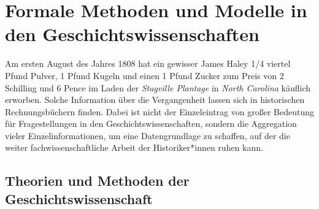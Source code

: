 \documentclass[12pt,a4paper]{article}
\begin{document}
\section{Formale Methoden und Modelle in den Geschichtswissenschaften}

Am ersten August des Jahres 1808 hat ein gewisser James Haley 1/4 viertel Pfund Pulver, 1 Pfund Kugeln und einen 1 Pfund Zucker zum Preis von 2 Schilling und 6 Pence im Laden der \textit{Stagville Plantage} in \textit{North Carolina} käuflich erworben. Solche Information über die Vergangenheit lassen sich in historischen Rechnungsbüchern finden. Dabei ist nicht der Einzeleintrag von großer Bedeutung für Fragestellungen in den Geschichtswissenschaften, sondern die Aggregation vieler Einzelinformationen, um eine Datengrundlage zu schaffen, auf der die weiter fachwissenschaftliche Arbeit der Historiker*innen ruhen kann.

\subsection{Theorien und Methoden der Geschichtswissenschaft}
\end{document}
